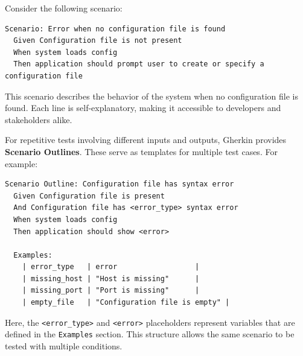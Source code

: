 \documentclass[10pt , a4paper]{report}
\begin{document}
Consider the following scenario:

\begin{verbatim}
Scenario: Error when no configuration file is found
  Given Configuration file is not present
  When system loads config
  Then application should prompt user to create or specify a configuration file
\end{verbatim}

This scenario describes the behavior of the system when no configuration file is found. Each line is self-explanatory, making it accessible to developers and stakeholders alike.

For repetitive tests involving different inputs and outputs, Gherkin provides \textbf{Scenario Outlines}. These serve as templates for multiple test cases. For example:

\begin{verbatim}
Scenario Outline: Configuration file has syntax error
  Given Configuration file is present
  And Configuration file has <error_type> syntax error
  When system loads config
  Then application should show <error>

  Examples:
    | error_type   | error                  |
    | missing_host | "Host is missing"      |
    | missing_port | "Port is missing"      |
    | empty_file   | "Configuration file is empty" |
\end{verbatim}

Here, the \texttt{<error\_type>} and \texttt{<error>} placeholders represent variables that are defined in the \texttt{Examples} section. This structure allows the same scenario to be tested with multiple conditions.
\end{document}
